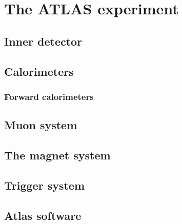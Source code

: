 \chapter{The ATLAS experiment}
\minitoc
\section{Inner detector}
\section{Calorimeters}
\subsection{Forward calorimeters}\label{sec:forwardCalo}
\section{Muon system}
\section{The magnet system}
\section{Trigger system}
\section{Atlas software}